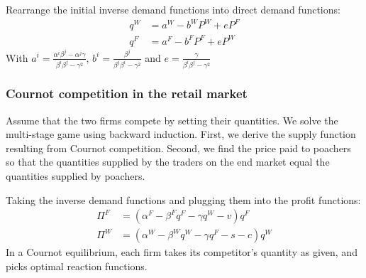 Rearrange the initial inverse demand functions into direct demand functions:
\begin{align}
    q^W &= a^W - b^W P^W + e P^F\\
    q^F &= a^F - b^F P^F + eP^W
\end{align}
With $a^i = \frac{\alpha^i \beta^j - \alpha^j\gamma}{\beta^i \beta^j - \gamma^2}$, $b^i = \frac{\beta^j}{\beta^j\beta^i - \gamma^2}$ and $e = \frac{\gamma}{\beta^i\beta^j - \gamma^2}$
\subsubsection{Cournot competition in the retail market}

Assume that the two firms compete by setting their quantities. We solve the multi-stage game using backward induction. First, we derive the supply function resulting from Cournot competition. Second, we find the price paid to poachers so that the quantities supplied by the traders on the end market equal the quantities supplied by poachers. 

Taking the inverse demand functions and plugging them into the profit functions:
\begin{align*}
    \Pi^F& = (\alpha^F - \beta^F q^F - \gamma q^W - v)q^F\\
    \Pi^W &= (\alpha^W - \beta^W q^W - \gamma q^F - s - c)q^W
\end{align*}
In a Cournot equilibrium, each firm takes its competitor's quantity as given, and picks optimal reaction functions.

